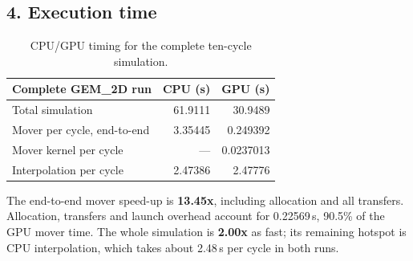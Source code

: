 \documentclass[11pt,a4paper]{article}
\begin{document}
\subsection*{4. Execution time}
\begin{table}[H]
\centering
\begin{tabular}{@{}lrr@{}}
\toprule
Complete GEM\_2D run & CPU (s) & GPU (s) \\
\midrule
Total simulation & 61.9111 & 30.9489 \\
Mover per cycle, end-to-end & 3.35445 & 0.249392 \\
Mover kernel per cycle & --- & 0.0237013 \\
Interpolation per cycle & 2.47386 & 2.47776 \\
\bottomrule
\end{tabular}
\caption{CPU/GPU timing for the complete ten-cycle simulation.}
\label{tab:bonus-timing}
\end{table}

The end-to-end mover speed-up is \textbf{13.45x}, including allocation and all
transfers. Allocation, transfers and launch overhead account for 0.22569\,s,
90.5\% of the GPU mover time. The whole simulation is \textbf{2.00x} as fast;
its remaining hotspot is CPU interpolation, which takes about 2.48\,s per cycle
in both runs.
\end{document}
